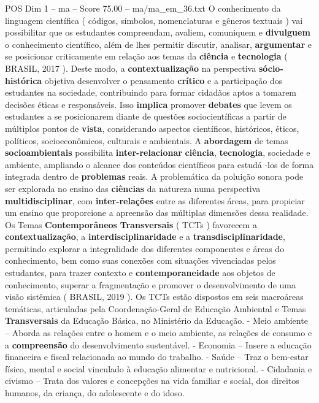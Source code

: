 \begin{textsample}{POS Dim 1 – ma – Score 75.00 – ma/ma\_em\_36.txt}
O conhecimento da linguagem científica ( códigos, símbolos, nomenclaturas e gêneros textuais ) vai possibilitar que os estudantes compreendam, avaliem, comuniquem e \textbf{divulguem} o conhecimento científico, além de lhes permitir discutir, analisar, \textbf{argumentar} e se posicionar criticamente em relação aos temas da \textbf{ciência} e \textbf{tecnologia} ( BRASIL, 2017 ).
Deste modo, a \textbf{contextualização} na perspectiva \textbf{sócio-histórica} objetiva desenvolver o pensamento \textbf{crítico} e a participação dos estudantes na sociedade, contribuindo para formar cidadãos aptos a tomarem decisões éticas e responsáveis.
Isso \textbf{implica} promover \textbf{debates} que levem os estudantes a se posicionarem diante de questões sociocientíficas a partir de múltiplos pontos de \textbf{vista}, considerando aspectos científicos, históricos, éticos, políticos, socioeconômicos, culturais e ambientais.
A \textbf{abordagem} de temas \textbf{socioambientais} possibilita \textbf{inter-relacionar} \textbf{ciência}, \textbf{tecnologia}, sociedade e ambiente, ampliando o alcance dos conteúdos científicos para estudá -los de forma integrada dentro de \textbf{problemas} reais.
A problemática da poluição sonora pode ser explorada no ensino das \textbf{ciências} da natureza numa perspectiva \textbf{multidisciplinar}, com \textbf{inter-relações} entre as diferentes áreas, para propiciar um ensino que proporcione a apreensão das múltiplas dimensões dessa realidade.
Os Temas \textbf{Contemporâneos} \textbf{Transversais} ( TCTs ) favorecem a \textbf{contextualização}, a \textbf{interdisciplinaridade} e a \textbf{transdisciplinaridade}, permitindo explorar a integralidade dos diferentes componentes e áreas do conhecimento, bem como suas conexões com situações vivenciadas pelos estudantes, para trazer contexto e \textbf{contemporaneidade} aos objetos de conhecimento, superar a fragmentação e promover o desenvolvimento de uma visão sistêmica ( BRASIL, 2019 ).
Os TCTs estão dispostos em seis macroáreas temáticas, articuladas pela Coordenação-Geral de Educação Ambiental e Temas \textbf{Transversais} da Educação Básica, no Ministério da Educação. - Meio ambiente – Aborda as relações entre o homem e o meio ambiente, as relações de consumo e a \textbf{compreensão} do desenvolvimento sustentável. - Economia – Insere a educação financeira e fiscal relacionada ao mundo do trabalho. - Saúde – Traz o bem-estar físico, mental e social vinculado à educação alimentar e nutricional. - Cidadania e civismo – Trata dos valores e concepções na vida familiar e social, dos direitos humanos, da criança, do adolescente e do idoso.

\end{textsample}
